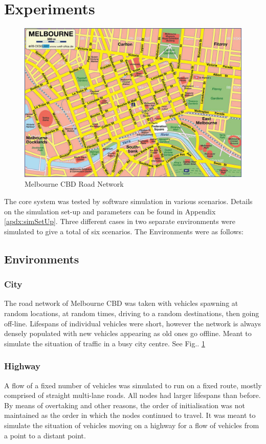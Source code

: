 \documentclass[journal]{IEEEtran}
\begin{document}
\section{Experiments}
\begin{figure}[!t]
	\caption{Melbourne CBD Road Network}
	\label{fig:CBDRoads}
	\includegraphics[width=\linewidth,keepaspectratio]{images/cbdmap.jpg}
\end{figure}
\label{sec:Experiments}
The core system was tested by software simulation in various scenarios. Details on the simulation set-up and parameters can be found in Appendix \ref{apdx:simSetUp}. Three different cases in two separate environments were simulated to give a total of six scenarios. The Environments were as follows:
\subsection{Environments}
\label{sec:Experiments:env}
\subsubsection{City}
	The road network of Melbourne CBD was taken with vehicles spawning at random locations, at random times, driving to a random destinations, then going off-line. Lifespans of individual vehicles were short, however the network is always densely populated with new vehicles appearing as old ones go offline.	Meant to simulate the situation of traffic in a busy city centre. See Fig.. \ref{fig:CBDRoads}	
\subsubsection{Highway}
	A flow of a fixed number of vehicles was simulated to run on a fixed route, mostly comprised of straight multi-lane roads. All nodes had larger lifespans than before. By means of overtaking and other reasons, the order of initialisation was not maintained as the order in which the nodes continued to travel. It was meant to simulate the situation of vehicles moving on a highway for a flow of vehicles from a point to a distant point.
\end{document}
